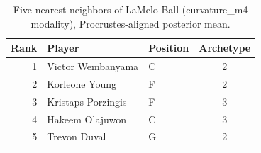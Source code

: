\begin{table}[htbp]
  \centering\small
  \begin{tabular}{rllc}
    \toprule
    Rank & Player & Position & Archetype \\
    \midrule
    1 & Victor Wembanyama & C & 2 \\
    2 & Korleone Young & F & 2 \\
    3 & Kristaps Porzingis & F & 3 \\
    4 & Hakeem Olajuwon & C & 3 \\
    5 & Trevon Duval & G & 2 \\
    \bottomrule
  \end{tabular}
  \caption{Five nearest neighbors of LaMelo Ball (curvature_m4 modality), Procrustes-aligned posterior mean.}
  \label{tab:LaMelo_Ball_neighbors_curvature_m4}
\end{table}

